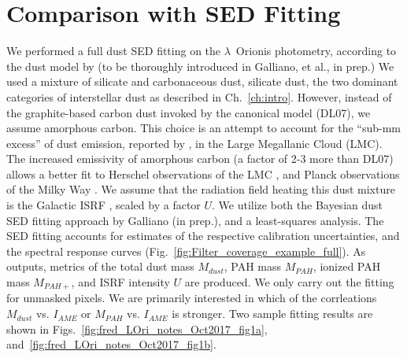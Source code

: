         \section{Comparison with SED Fitting}
          We performed a full dust SED fitting on the $\lambda$~Orionis photometry, according to the dust model by \cite{galliano11} (to be thoroughly introduced in Galliano, et al., in prep.)  We used a mixture of silicate and carbonaceous dust, silicate dust, the two dominant categories of interstellar dust as described in Ch.~\ref{ch:intro}. However, instead of the graphite-based carbon dust invoked by the canonical \cite{draine07} model (DL07), we assume amorphous carbon. This choice is an attempt to account for the ``sub-mm excess'' of dust emission, reported by \cite{israel10, bot10}, in the Large Megallanic Cloud (LMC). The increased emissivity of amorphous carbon (a factor of 2-3 more than DL07) allows a better fit to Herschel observations of the LMC \citep{galliano11}, and Planck observations of the Milky Way \citep{planckIntXXIX16}. We assume that the radiation field heating this dust mixture is the Galactic ISRF \citep{mathis83}, scaled by a factor $U$.
          We utilize both the Bayesian dust SED fitting approach by Galliano (in prep.), and a least-squares analysis. The SED fitting accounts for estimates of the respective calibration uncertainties, and the spectral response curves (Fig.~\ref{fig:Filter_coverage_example_full}). As outputs, metrics of the total dust mass $M_{dust}$, PAH mass $M_{PAH}$, ionized PAH mass $M_{PAH+}$, and ISRF intensity $U$ are produced. We only carry out the fitting for unmasked pixels. We are primarily interested in which of the corrleations $M_{dust}$ vs. $I_{AME}$ or $M_{PAH}$ vs. $I_{AME}$ is stronger.
          Two sample fitting results are shown in Figs.~\ref{fig:fred_LOri_notes_Oct2017_fig1a}, and~\ref{fig:fred_LOri_notes_Oct2017_fig1b}.
